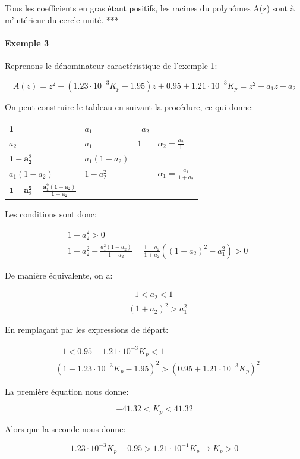 \documentclass[11pt]{article}
\begin{document}
    Tous les coefficients en gras étant positifs, les racines du polynômes
A(z) sont à m'intérieur du cercle unité. ***

    \paragraph{Exemple 3}\label{exemple-3}

Reprenons le dénominateur caractéristique de l'exemple 1:

\[ A(z) = z^2+(1.23\cdot 10^{-3}K_p-1.95)z+0.95+1.21\cdot 10^{-3}K_p = z^2 + a_1z + a_2 \]

    On peut construire le tableau en suivant la procédure, ce qui donne:

\begin{longtable}[]{@{}llll@{}}
\toprule
\( \mathbf{1} \) & \( a_1 \) & ~\( a_2 \) &\tabularnewline
\( a_2 \) & \( a_1 \) & \( 1 \) &
\( \alpha_2 = \frac{a_2}{1} \)\tabularnewline
\( \mathbf{1 - a_2^2} \) & \( a_1(1-a_2) \) &\tabularnewline
\( a_1(1-a_2) \) & \( 1 - a_2^2 \) & &
\( \alpha_1 = \frac{a_1}{1+a_2} \)\tabularnewline
\( \mathbf{1 - a_2^2 - \frac{a_1^2(1-a_2)}{1+a_2}} \) &\tabularnewline
\bottomrule
\end{longtable}

    Les conditions sont donc:

\begin{align}
  &1 - a_2^2 > 0 \\
  &1 - a_2^2 - \frac{a_1^2(1-a_2)}{1+a_2} = \frac{1-a_2}{1+a_2}\left((1+a_2)^2-a_1^2\right) > 0
\end{align}

    De manière équivalente, on a:

\begin{align}
  &-1 < a_2 < 1 \\
  &(1+a_2)^2 > a_1^2
\end{align}

    En remplaçant par les expressions de départ:

\begin{align}
  &-1 < 0.95+1.21\cdot 10^{-3}K_p < 1 \\
  &(1 + 1.23\cdot 10^{-3}K_p-1.95)^2 > (0.95+1.21\cdot 10^{-3}K_p)^2
\end{align}

    La première équation nous donne:

\[ -41.32 < K_p < 41.32 \]

Alors que la seconde nous donne:

\[ 1.23 \cdot 10^{-3} K_p - 0.95 > 1.21 \cdot 10^{-1} K_p \rightarrow K_p > 0 \]
\end{document}
